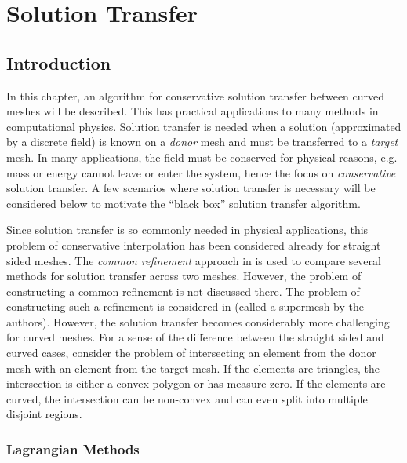 \chapter{Solution Transfer}\label{chap:solution-transfer}

\section{Introduction}

In this chapter, an algorithm for conservative solution transfer between curved
meshes will be described. This has practical applications to many methods in
computational physics. Solution transfer is needed when a solution
(approximated by a discrete field) is known on a \emph{donor} mesh and must
be transferred to a \emph{target} mesh. In many applications, the field
must be conserved for physical reasons, e.g. mass or energy cannot leave or
enter the system, hence the focus on \emph{conservative} solution transfer.
A few scenarios where solution transfer is necessary will be considered below
to motivate the ``black box'' solution transfer algorithm.

Since solution transfer is so commonly needed in physical applications, this
problem of conservative interpolation has been considered already for
straight sided meshes. The \emph{common refinement} approach in
\cite{Jiao2004} is used to compare several methods for solution transfer across
two meshes. However, the problem of constructing a common refinement is
not discussed there. The problem of constructing such a refinement is
considered in \cite{Farrell2009, Farrell2011} (called a supermesh by
the authors).
However, the solution transfer becomes considerably more challenging for curved
meshes. For a sense of the difference between the straight sided and curved
cases, consider the problem of intersecting an element from the donor mesh
with an element from the target mesh. If the elements are triangles, the
intersection is either a convex polygon or has measure zero. If the elements
are curved, the intersection can be non-convex and can even split into
multiple disjoint regions.

\subsection{Lagrangian Methods}

